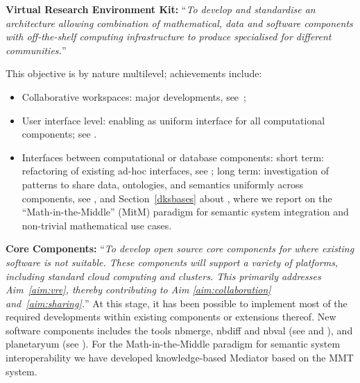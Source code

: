 \begin{compactenum}[\bf {Obj} 1\rm]
\item\label{objective:framework} \textbf{Virtual Research Environment Kit:} ``\emph{To develop and standardise an architecture
    allowing combination of mathematical, data and software components with off-the-shelf
    computing infrastructure to produce specialised \VREs for different communities.}''

  This objective is by nature multilevel; achievements include:
  \begin{itemize}
  \item Collaborative workspaces: major \JupyterHub developments,
    see~;
  \item User interface level: enabling \Jupyter as uniform interface for all computational
    components; see .
  \item Interfaces between computational or database components: short term: refactoring
    of existing ad-hoc interfaces, see ; long term:
    investigation of patterns to share data, ontologies, and semantics uniformly across
    components, see , and
    Section~\ref{dksbases} about , where we report on the
    ``Math-in-the-Middle'' (MitM) paradigm for semantic system integration and non-trivial
    mathematical use cases. 
  \end{itemize}

\item\label{objectives:core} \textbf{Core Components:}
  ``\emph{To develop open source core components
  for \VREs where existing software is not suitable. These components
  will support a variety of platforms, including standard cloud
  computing and clusters. This primarily addresses Aim~\ref{aim:vre},
  thereby contributing to Aim \ref{aim:collaboration}
  and~\ref{aim:sharing}.}''
  At this stage, it has been possible to implement most of the required developments within
  existing components or extensions thereof. New software components includes the tools
  nbmerge, nbdiff and nbval (see  and
  ), and planetaryum (see ). For the
  Math-in-the-Middle paradigm for semantic system interoperability we have developed
  knowledge-based Mediator based on the MMT system. 


\end{compactenum}
